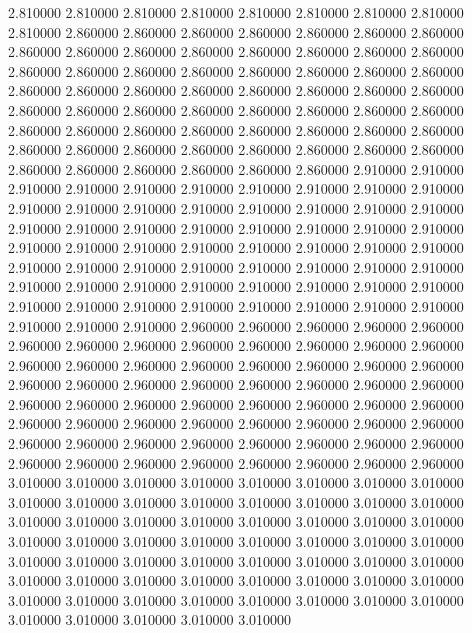 2.810000
2.810000
2.810000
2.810000
2.810000
2.810000
2.810000
2.810000
2.810000
2.860000
2.860000
2.860000
2.860000
2.860000
2.860000
2.860000
2.860000
2.860000
2.860000
2.860000
2.860000
2.860000
2.860000
2.860000
2.860000
2.860000
2.860000
2.860000
2.860000
2.860000
2.860000
2.860000
2.860000
2.860000
2.860000
2.860000
2.860000
2.860000
2.860000
2.860000
2.860000
2.860000
2.860000
2.860000
2.860000
2.860000
2.860000
2.860000
2.860000
2.860000
2.860000
2.860000
2.860000
2.860000
2.860000
2.860000
2.860000
2.860000
2.860000
2.860000
2.860000
2.860000
2.860000
2.860000
2.860000
2.860000
2.860000
2.860000
2.860000
2.860000
2.910000
2.910000
2.910000
2.910000
2.910000
2.910000
2.910000
2.910000
2.910000
2.910000
2.910000
2.910000
2.910000
2.910000
2.910000
2.910000
2.910000
2.910000
2.910000
2.910000
2.910000
2.910000
2.910000
2.910000
2.910000
2.910000
2.910000
2.910000
2.910000
2.910000
2.910000
2.910000
2.910000
2.910000
2.910000
2.910000
2.910000
2.910000
2.910000
2.910000
2.910000
2.910000
2.910000
2.910000
2.910000
2.910000
2.910000
2.910000
2.910000
2.910000
2.910000
2.910000
2.910000
2.910000
2.910000
2.910000
2.910000
2.910000
2.910000
2.910000
2.910000
2.960000
2.960000
2.960000
2.960000
2.960000
2.960000
2.960000
2.960000
2.960000
2.960000
2.960000
2.960000
2.960000
2.960000
2.960000
2.960000
2.960000
2.960000
2.960000
2.960000
2.960000
2.960000
2.960000
2.960000
2.960000
2.960000
2.960000
2.960000
2.960000
2.960000
2.960000
2.960000
2.960000
2.960000
2.960000
2.960000
2.960000
2.960000
2.960000
2.960000
2.960000
2.960000
2.960000
2.960000
2.960000
2.960000
2.960000
2.960000
2.960000
2.960000
2.960000
2.960000
2.960000
2.960000
2.960000
2.960000
2.960000
2.960000
2.960000
2.960000
2.960000
3.010000
3.010000
3.010000
3.010000
3.010000
3.010000
3.010000
3.010000
3.010000
3.010000
3.010000
3.010000
3.010000
3.010000
3.010000
3.010000
3.010000
3.010000
3.010000
3.010000
3.010000
3.010000
3.010000
3.010000
3.010000
3.010000
3.010000
3.010000
3.010000
3.010000
3.010000
3.010000
3.010000
3.010000
3.010000
3.010000
3.010000
3.010000
3.010000
3.010000
3.010000
3.010000
3.010000
3.010000
3.010000
3.010000
3.010000
3.010000
3.010000
3.010000
3.010000
3.010000
3.010000
3.010000
3.010000
3.010000
3.010000
3.010000
3.010000
3.010000
3.010000

